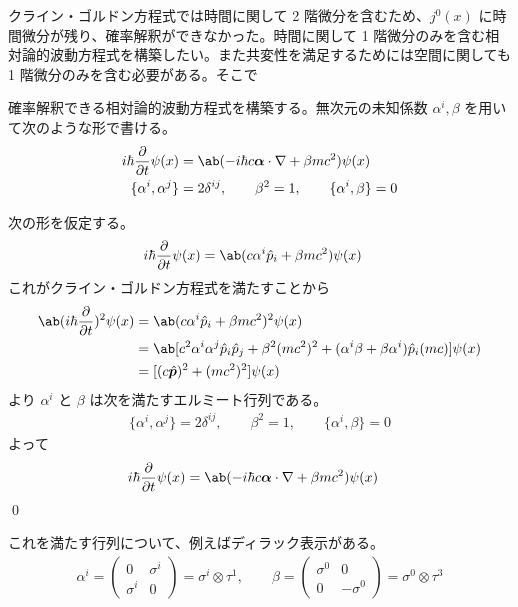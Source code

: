 \documentclass[uplatex,dvipdfmx,a4paper,11pt]{jlreq}
\makeatletter
\newcommand{\pp}{\bm{p}}
\newcommand{\vnabla}{\mathbf{\nabla}}
\numberwithin{equation}{section}
\theoremstyle{definition}
\renewenvironment{proof}[1][\proofname]{\par
  \normalfont
  \topsep6\p@\@plus6\p@ \trivlist
  \item[\hskip\labelsep{\bfseries #1}\@addpunct{\bfseries}]\ignorespaces\quad\par
}{%
  \qed\endtrivlist\@endpefalse
}
\renewcommand\proofname{証明}
\makeatother
\begin{document}
クライン・ゴルドン方程式では時間に関して 2 階微分を含むため、$j^0(x)$ に時間微分が残り、確率解釈ができなかった。時間に関して 1 階微分のみを含む相対論的波動方程式を構築したい。また共変性を満足するためには空間に関しても 1 階微分のみを含む必要がある。そこで
\begin{theorem}[ディラック方程式]
  確率解釈できる相対論的波動方程式を構築する。無次元の未知係数 $\alpha^i, \beta$ を用いて次のような形で書ける。
  \begin{align}
    i\hbar\diffp{}{t}\psi(x)        & = \ab(-i\hbar c\bm{\alpha}\cdot\vnabla + \beta mc^2)\psi(x)                                   \\
    \lbrace\alpha^i,\alpha^j\rbrace & = 2\delta^{ij}, \qquad \beta^2 = 1, \qquad \lbrace\alpha^i,\beta\rbrace = 0 \label{condition}
  \end{align}
\end{theorem}
\begin{proof}
  次の形を仮定する。
  \begin{align}
    i\hbar\diffp{}{t}\psi(x) & = \ab(c\alpha^i\hat{p}_i + \beta mc^2)\psi(x)
  \end{align}
  これがクライン・ゴルドン方程式を満たすことから
  \begin{align}
    \ab(i\hbar\diffp{}{t})^2\psi(x) & = \ab(c\alpha^i\hat{p}_i + \beta mc^2)^2\psi(x)                                                                      \\
                                    & = \ab[c^2\alpha^i\alpha^j\hat{p}_i\hat{p}_j + \beta^2(mc^2)^2 + (\alpha^i\beta + \beta\alpha^i)\hat{p}_i(mc)]\psi(x) \\
                                    & = [(c\hat{\pp})^2 + (mc^2)^2]\psi(x)
  \end{align}
  より $\alpha^i$ と $\beta$ は次を満たすエルミート行列である。
  \begin{align}
    \lbrace\alpha^i,\alpha^j\rbrace = 2\delta^{ij}, \qquad \beta^2 = 1, \qquad \lbrace\alpha^i,\beta\rbrace = 0 \label{condition}
  \end{align}
  よって
  \begin{align}
    i\hbar\diffp{}{t}\psi(x) & = \ab(-i\hbar c\bm{\alpha}\cdot\vnabla + \beta mc^2)\psi(x)
  \end{align}
\end{proof}

これを満たす行列について、例えばディラック表示がある。
\begin{align}
  \alpha^i = \begin{pmatrix}
               0        & \sigma^i \\
               \sigma^i & 0
             \end{pmatrix} = \sigma^i \otimes \tau^1, \qquad
  \beta = \begin{pmatrix}
            \sigma^0 & 0         \\
            0        & -\sigma^0
          \end{pmatrix} = \sigma^0 \otimes \tau^3
\end{align}
\end{document}
